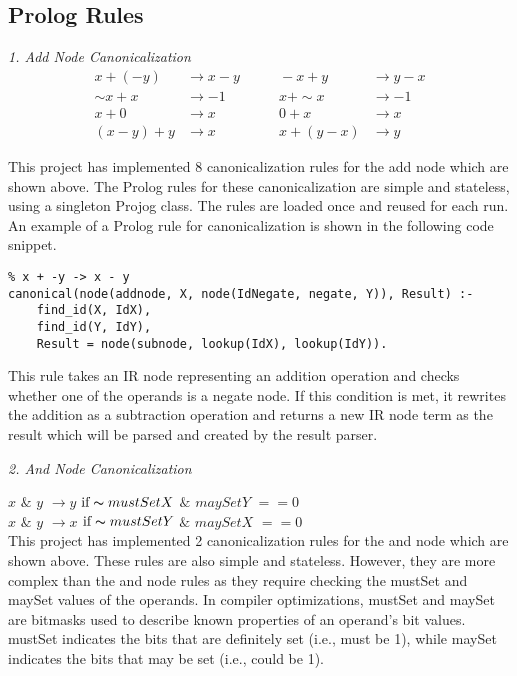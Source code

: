 \subsection{{Prolog Rules}}

\textit{1. Add Node Canonicalization}
\begin{align*}
    x + (-y)          &\rightarrow x - y        &\qquad -x + y           &\rightarrow y - x \\
    \sim x + x        &\rightarrow -1           &\qquad x + \sim x       &\rightarrow -1     \\
    x + 0             &\rightarrow x            &\qquad 0 + x            &\rightarrow x      \\
    (x - y) + y       &\rightarrow x            &\qquad x + (y - x)      &\rightarrow y
\end{align*}
    
This project has implemented 8 canonicalization rules for the add node which are shown above.
The Prolog rules for these canonicalization are simple and stateless, using a singleton Projog class. 
The rules are loaded once and reused for each run. 
An example of a Prolog rule for canonicalization is shown in the following code snippet. 

\begin{lstlisting}
% x + -y -> x - y
canonical(node(addnode, X, node(IdNegate, negate, Y)), Result) :-
    find_id(X, IdX),
    find_id(Y, IdY),
    Result = node(subnode, lookup(IdX), lookup(IdY)).
\end{lstlisting}
    
This rule takes an IR node representing an addition operation and checks whether one of the operands is a negate node. 
If this condition is met, it rewrites the addition as a subtraction operation and returns a new IR node term
as the result which will be parsed and created by the result parser.

\bigbreak
\textit{2. And Node Canonicalization}
\smallbreak

$x$ $\&$ $y$ $\rightarrow y$ $\text{if} \thicksim mustSetX$ $\&$ $maySetY$ $== 0$\\

$x$ $\&$ $y$ $\rightarrow x$ $\text{if} \thicksim mustSetY$ $\&$ $maySetX$ $== 0$\\

This project has implemented 2 canonicalization rules for the and node which are shown above.
These rules are also simple and stateless.
However, they are more complex than the and node rules as they require checking the mustSet and maySet values of the operands.
In compiler optimizations, mustSet and maySet are bitmasks used to describe known properties of an operand's bit values. mustSet indicates the bits that are definitely set (i.e., must be 1), while maySet indicates the bits that may be set (i.e., could be 1).


